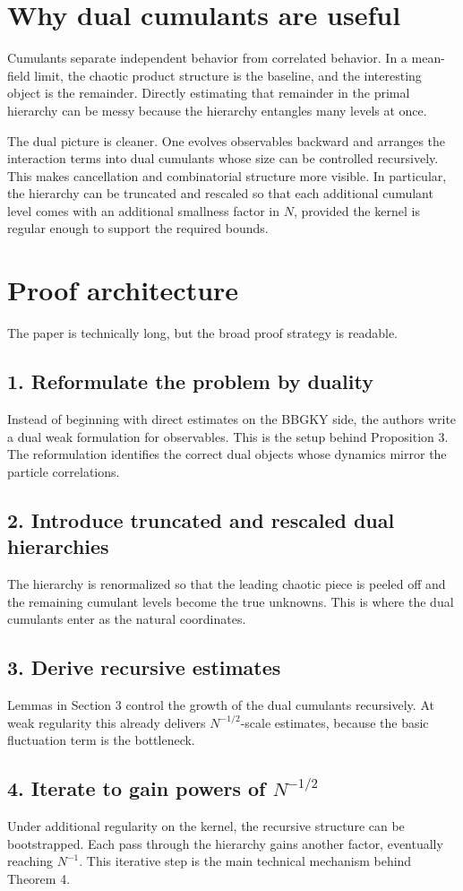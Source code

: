 \documentclass[11pt]{article}
\begin{document}
\section*{Why dual cumulants are useful}
Cumulants separate independent behavior from correlated behavior. In a mean-field limit, the chaotic product structure is the baseline, and the interesting object is the remainder. Directly estimating that remainder in the primal hierarchy can be messy because the hierarchy entangles many levels at once.

The dual picture is cleaner. One evolves observables backward and arranges the interaction terms into dual cumulants whose size can be controlled recursively. This makes cancellation and combinatorial structure more visible. In particular, the hierarchy can be truncated and rescaled so that each additional cumulant level comes with an additional smallness factor in $N$, provided the kernel is regular enough to support the required bounds.
\section*{Proof architecture}
The paper is technically long, but the broad proof strategy is readable.
\subsection*{1. Reformulate the problem by duality}
Instead of beginning with direct estimates on the BBGKY side, the authors write a dual weak formulation for observables. This is the setup behind Proposition 3. The reformulation identifies the correct dual objects whose dynamics mirror the particle correlations.
\subsection*{2. Introduce truncated and rescaled dual hierarchies}
The hierarchy is renormalized so that the leading chaotic piece is peeled off and the remaining cumulant levels become the true unknowns. This is where the dual cumulants enter as the natural coordinates.
\subsection*{3. Derive recursive estimates}
Lemmas in Section 3 control the growth of the dual cumulants recursively. At weak regularity this already delivers $N^{-1/2}$-scale estimates, because the basic fluctuation term is the bottleneck.
\subsection*{4. Iterate to gain powers of $N^{-1/2}$}
Under additional regularity on the kernel, the recursive structure can be bootstrapped. Each pass through the hierarchy gains another factor, eventually reaching $N^{-1}$. This iterative step is the main technical mechanism behind Theorem 4.
\end{document}
